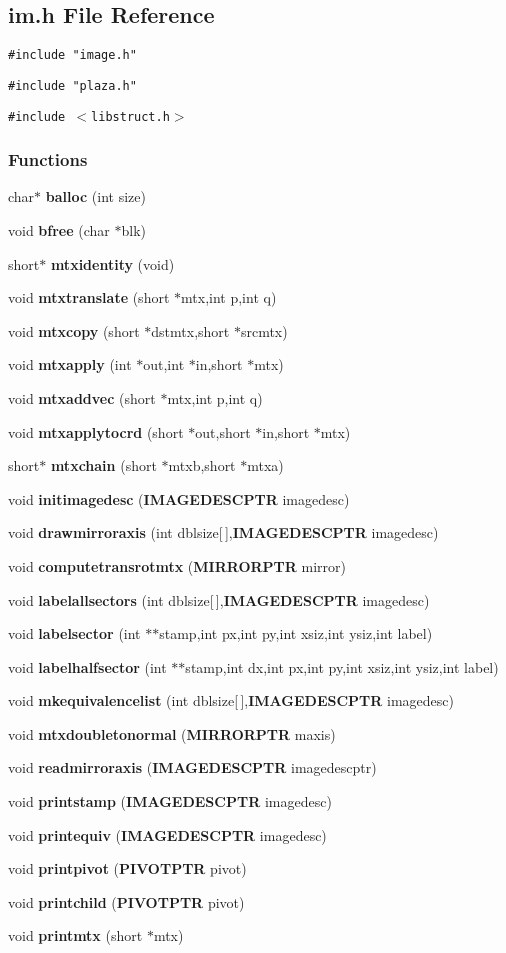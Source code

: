\subsection{im.h File Reference}
\label{im.h}
{\tt \#include "image.h"}\par
{\tt \#include "plaza.h"}\par
{\tt \#include $<$libstruct.h$>$}\par
\subsubsection*{Functions}
\begin{CompactItemize}
\item 
char$\ast$ {\bf balloc} (int size)
\item 
void {\bf bfree} (char $\ast$blk)
\item 
short$\ast$ {\bf mtxidentity} (void)
\item 
void {\bf mtxtranslate} (short $\ast$mtx,int p,int q)
\item 
void {\bf mtxcopy} (short $\ast$dstmtx,short $\ast$srcmtx)
\item 
void {\bf mtxapply} (int $\ast$out,int $\ast$in,short $\ast$mtx)
\item 
void {\bf mtxaddvec} (short $\ast$mtx,int p,int q)
\item 
void {\bf mtxapplytocrd} (short $\ast$out,short $\ast$in,short $\ast$mtx)
\item 
short$\ast$ {\bf mtxchain} (short $\ast$mtxb,short $\ast$mtxa)
\item 
void {\bf initimagedesc} ({\bf IMAGEDESCPTR} imagedesc)
\item 
void {\bf drawmirroraxis} (int dblsize[$\,$],{\bf IMAGEDESCPTR} imagedesc)
\item 
void {\bf computetransrotmtx} ({\bf MIRRORPTR} mirror)
\item 
void {\bf labelallsectors} (int dblsize[$\,$],{\bf IMAGEDESCPTR} imagedesc)
\item 
void {\bf labelsector} (int $\ast$$\ast$stamp,int px,int py,int xsiz,int ysiz,int label)
\item 
void {\bf labelhalfsector} (int $\ast$$\ast$stamp,int dx,int px,int py,int xsiz,int ysiz,int label)
\item 
void {\bf mkequivalencelist} (int dblsize[$\,$],{\bf IMAGEDESCPTR} imagedesc)
\item 
void {\bf mtxdoubletonormal} ({\bf MIRRORPTR} maxis)
\item 
void {\bf readmirroraxis} ({\bf IMAGEDESCPTR} imagedescptr)
\item 
void {\bf printstamp} ({\bf IMAGEDESCPTR} imagedesc)
\item 
void {\bf printequiv} ({\bf IMAGEDESCPTR} imagedesc)
\item 
void {\bf printpivot} ({\bf PIVOTPTR} pivot)
\item 
void {\bf printchild} ({\bf PIVOTPTR} pivot)
\item 
void {\bf printmtx} (short $\ast$mtx)
\end{CompactItemize}


